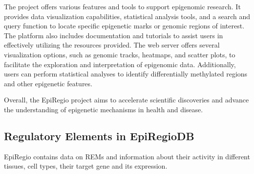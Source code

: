 \documentclass[pdftex,12pt,a4paper]{report}
\begin{document}
The project offers various features and tools to support epigenomic research. It provides data visualization capabilities, statistical analysis tools, and a search and query function to locate specific epigenetic marks or genomic regions of interest. The platform also includes documentation and tutorials to assist users in effectively utilizing the resources provided. The web server offers several visualization options, such as genomic tracks, heatmaps, and scatter plots, to facilitate the exploration and interpretation of epigenomic data. Additionally, users can perform statistical analyses to identify differentially methylated regions and other epigenetic features.

Overall, the EpiRegio project aims to accelerate scientific discoveries and advance the understanding of epigenetic mechanisms in health and disease.


\subsection{Regulatory Elements in EpiRegioDB}
EpiRegio contains data on REMs and information about their activity in different tissues, cell types, their target gene and its expression\cite{regelements}. 
\end{document}
